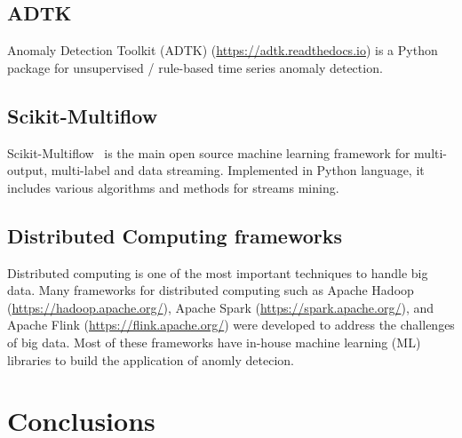 
\subsection{ADTK}
Anomaly Detection Toolkit (ADTK) (\href{https://adtk.readthedocs.io}{https://adtk.readthedocs.io})
is a Python package for unsupervised / rule-based time series anomaly detection.

\subsection{Scikit-Multiflow}
Scikit-Multiflow~\cite{montiel2018scikit}
is the main open source machine learning framework
for multi-output,
multi-label and data streaming.
Implemented in Python language,
it includes various algorithms and
methods for streams mining.

\subsection{Distributed Computing frameworks}
Distributed computing is one of the most
important techniques to handle big data.
Many frameworks for distributed computing
such as Apache Hadoop
(\href{https://hadoop.apache.org/}{https://hadoop.apache.org/}),
Apache Spark
(\href{https://spark.apache.org/}{https://spark.apache.org/}),
and Apache Flink
(\href{https://flink.apache.org/}{https://flink.apache.org/})
were developed to address the challenges of big data.
Most of these frameworks
have in-house machine learning (ML) libraries to build 
the application of anomly detecion.



\section{Conclusions} \label{sec-conclusions}

